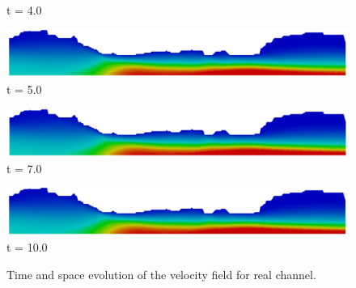 \begin{figure}[H]
\begin{minipage}{.50\linewidth}
      t = 4.0
     \end{minipage}%
     \begin{minipage}{.50\linewidth}
      \centering
      \includegraphics[scale=0.12]{./02_chaps/cap_solution/figure/vel_Real10000.png}\\
      t = 5.0
     \end{minipage}
     \begin{minipage}{.50\linewidth}
     \medskip
      \centering
      \includegraphics[scale=0.12]{./02_chaps/cap_solution/figure/vel_Real14000.png}\\
      t = 7.0
     \end{minipage}%
     \begin{minipage}{.50\linewidth}
     \medskip
      \centering
      \includegraphics[scale=0.12]{./02_chaps/cap_solution/figure/vel_Real20000.png}\\
      t = 10.0
     \end{minipage}
     \medskip
     \caption{Time and space evolution of the velocity field for real channel.} 
     \label{velocity field real}
\end{figure}

\newpage
